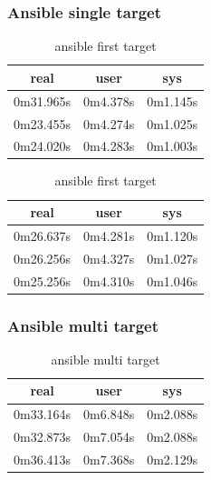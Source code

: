 \documentclass[10pt,]{report}
\begin{document}
\begin{adjustwidth}{20pt}{}
	\subsubsection{Ansible single target}
	\begin{table}[H]
		\caption{ansible first target}
		\begin{center}
			\begin{tabular}[c]{|c|c|c|}
				\hline
				\multicolumn{1}{|c|}{\textbf{real}} &
				\multicolumn{1}{c|}{\textbf{user}}  &
				\multicolumn{1}{c|}{\textbf{sys}}                         \\
				\hline
				0m31.965s                           & 0m4.378s & 0m1.145s \\
				\hline
				0m23.455s                           & 0m4.274s & 0m1.025s \\
				\hline
				0m24.020s                           & 0m4.283s & 0m1.003s \\
				\hline
			\end{tabular}
		\end{center}
	\end{table}
	\vspace{-5mm}
	\begin{table}[H]
		\caption{ansible first target}
		\begin{center}
			\begin{tabular}[c]{|c|c|c|}
				\hline
				\multicolumn{1}{|c|}{\textbf{real}} &
				\multicolumn{1}{c|}{\textbf{user}}  &
				\multicolumn{1}{c|}{\textbf{sys}}                         \\
				\hline
				0m26.637s                           & 0m4.281s & 0m1.120s \\
				\hline
				0m26.256s                           & 0m4.327s & 0m1.027s \\
				\hline
				0m25.256s                           & 0m4.310s & 0m1.046s \\
				\hline
			\end{tabular}
		\end{center}
	\end{table}
	\subsubsection{Ansible multi target}
	\begin{table}[H]
		\caption{ansible multi target}
		\begin{center}
			\begin{tabular}[c]{|c|c|c|}
				\hline
				\multicolumn{1}{|c|}{\textbf{real}} &
				\multicolumn{1}{c|}{\textbf{user}}  &
				\multicolumn{1}{c|}{\textbf{sys}}                         \\
				\hline
				0m33.164s                           & 0m6.848s & 0m2.088s \\
				\hline
				0m32.873s                           & 0m7.054s & 0m2.088s \\
				\hline
				0m36.413s                           & 0m7.368s & 0m2.129s \\
				\hline
			\end{tabular}
		\end{center}
	\end{table}

\end{adjustwidth}
\end{document}

